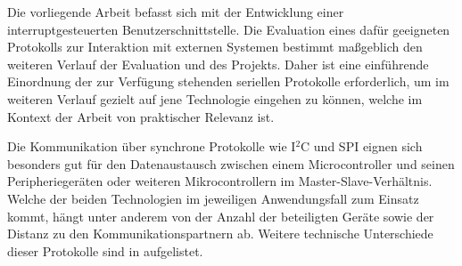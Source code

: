 Die vorliegende Arbeit befasst sich mit der Entwicklung einer interruptgesteuerten Benutzerschnittstelle. Die Evaluation eines daf\"ur geeigneten Protokolls zur Interaktion mit externen  Systemen bestimmt ma{\ss}geblich den weiteren Verlauf der Evaluation und des Projekts. Daher ist eine einf\"uhrende Einordnung der zur Verf\"ugung stehenden seriellen Protokolle erforderlich, um im weiteren Verlauf gezielt auf jene Technologie eingehen zu k\"onnen, welche im Kontext der Arbeit von praktischer Relevanz ist.

Die Kommunikation \"uber synchrone Protokolle wie I$^{2}$C und SPI eignen sich besonders gut f\"ur den Datenaustausch zwischen einem Microcontroller und seinen Peripherieger\"aten oder weiteren Mikrocontrollern im Master-Slave-Verh\"altnis. Welche der beiden Technologien im jeweiligen Anwendungsfall zum Einsatz kommt, h\"angt unter anderem von der Anzahl der beteiligten Ger\"ate sowie der Distanz zu den Kommunikationspartnern ab. Weitere technische Unterschiede dieser Protokolle sind in  aufgelistet.

